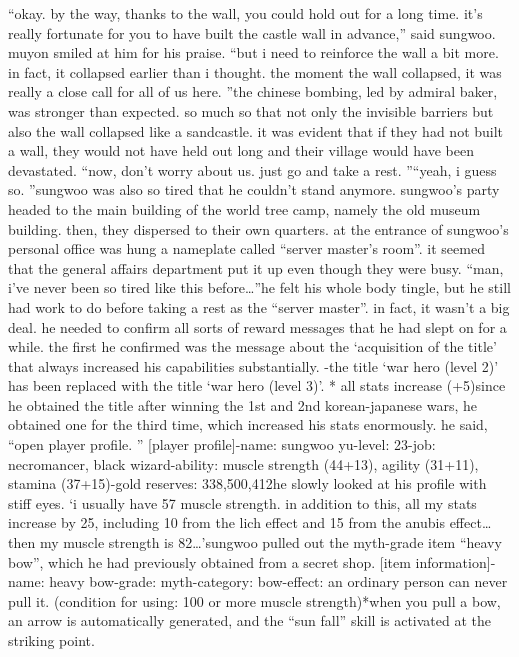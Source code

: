“okay.
 by the way, thanks to the wall, you could hold out for a long time.
 it’s really fortunate for you to have built the castle wall in advance,” said sungwoo.
muyon smiled at him for his praise.
“but i need to reinforce the wall a bit more.
 in fact, it collapsed earlier than i thought.
 the moment the wall collapsed, it was really a close call for all of us here.
”the chinese bombing, led by admiral baker, was stronger than expected.
 so much so that not only the invisible barriers but also the wall collapsed like a sandcastle.
it was evident that if they had not built a wall, they would not have held out long and their village would have been devastated.
“now, don’t worry about us.
 just go and take a rest.
”“yeah, i guess so.
”sungwoo was also so tired that he couldn’t stand anymore.
sungwoo’s party headed to the main building of the world tree camp, namely the old museum building.
 then, they dispersed to their own quarters.
at the entrance of sungwoo’s personal office was hung a nameplate called “server master’s room”.
 it seemed that the general affairs department put it up even though they were busy.
“man, i’ve never been so tired like this before…”he felt his whole body tingle, but he still had work to do before taking a rest as the “server master”.
 in fact, it wasn’t a big deal.
 he needed to confirm all sorts of reward messages that he had slept on for a while.
 the first he confirmed was the message about the ‘acquisition of the title’ that always increased his capabilities substantially.
-the title ‘war hero (level 2)’ has been replaced with the title ‘war hero (level 3)’.
* all stats increase (+5)since he obtained the title after winning the 1st and 2nd korean-japanese wars, he obtained one for the third time, which increased his stats enormously.
he said, “open player profile.
”
[player profile]-name: sungwoo yu-level: 23-job: necromancer, black wizard-ability: muscle strength (44+13), agility (31+11), stamina (37+15)-gold reserves: 338,500,412he slowly looked at his profile with stiff eyes.
‘i usually have 57 muscle strength.
 in addition to this, all my stats increase by 25, including 10 from the lich effect and 15 from the anubis effect…then my muscle strength is 82…’sungwoo pulled out the myth-grade item “heavy bow”, which he had previously obtained from a secret shop.
[item information]-name: heavy bow-grade: myth-category: bow-effect: an ordinary person can never pull it.
 (condition for using: 100 or more muscle strength)*when you pull a bow, an arrow is automatically generated, and the “sun fall” skill is activated at the striking point.
